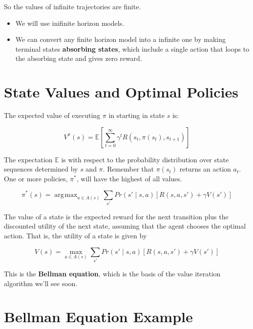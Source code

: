\documentclass[11pt]{article}
\DeclareMathOperator*{\argmax}{arg\!max}
\begin{document}
So the values of infinite trajectories are finite.

\begin{itemize}
\item We will use inifinite horizon models.
\item We can convert any finite horizon model into a infinite one by making terminal states \textbf{absorbing states}, which include a single action that loops to the absorbing state and gives zero reward.
\end{itemize}
\section{State Values and Optimal Policies}
\label{sec:org30036a3}

The expected value of executing \(\pi\) in starting in state \(s\) is:

\begin{equation*}
V^{\pi}(s) = \mathbb{E} \left[ \sum_{t=0}^{\infty} \gamma^t R(s_t, \pi(s_t), s_{t+1}) \right]
\end{equation*}

The expectation \(\mathbb{E}\) is with respect to the probability distribution over state sequences
determined by \(s\) and \(\pi\).  Remember that \(\pi(s_t)\) returns an action \(a_t\).  One or more policies, \(\pi^*\), will have the highest of all values.

\begin{equation*}
\pi^*(s) = \argmax_{a \in A(s)} \sum_{s'} Pr(s' \mid s, a) \left[ R(s, a, s') + \gamma V(s') \right] \tag{17.4}
\end{equation*}

The value of a state is the expected reward for the next transition plus the discounted utility of the next state, assuming that the agent chooses the optimal action. That is, the utility of a state is given by

\begin{equation*}
V(s) = \max_{a \in A(s)} \sum_{s'} Pr(s' \mid s, a) \left[ R(s, a, s') + \gamma V(s') \right] \tag{17.5}
\end{equation*}

This is the \textbf{Bellman equation}, which is the basis of the value iteration algorithm we'll see soon.
\section{Bellman Equation Example}
\label{sec:org529174c}
\end{document}
